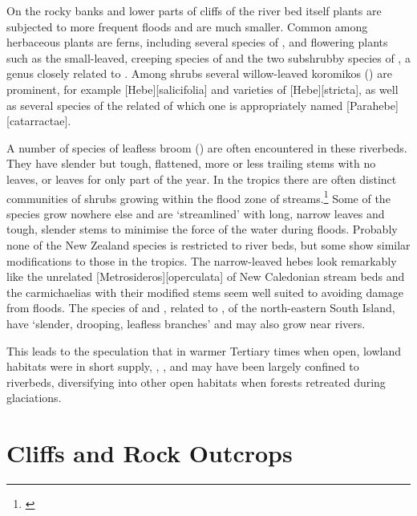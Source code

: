 On the rocky banks and lower parts of cliffs of the river bed itself plants are subjected to more frequent floods and are much smaller.
Common among herbaceous plants are ferns, including several species of , and flowering plants such as the small-leaved, creeping species of  and the two subshrubby species of , a genus closely related to .
Among shrubs several willow-leaved koromikos () are prominent, for example [Hebe][salicifolia] and varieties of [Hebe][stricta], as well as several species of the related  of which one is appropriately named [Parahebe][catarractae].

A number of species of leafless broom () are often encountered in these riverbeds.
They have slender but tough, flattened, more or less trailing stems with no leaves, or leaves for only part of the year.
In the tropics there are often distinct communities of shrubs growing within the flood zone of streams.\footnote{\cite{ansteenis1981rheophytes}}
Some of the species grow nowhere else and are `streamlined' with long, narrow leaves and tough, slender stems to minimise the force of the water during floods.
Probably none of the New Zealand species is restricted to river beds, but some show similar modifications to those in the tropics.
The narrow-leaved hebes look remarkably like the unrelated [Metrosideros][operculata] of New Caledonian stream beds and the carmichaelias with their modified stems seem well suited to avoiding damage from floods.
The species of  and , related to , of the north-eastern South Island, have `slender, drooping, leafless branches' and may also grow near rivers.

This leads to the speculation that in warmer Tertiary times when open, lowland habitats were in short supply, , , and  may have been largely confined to riverbeds, diversifying into other open habitats when forests retreated during glaciations.

\section{Cliffs and Rock Outcrops}

